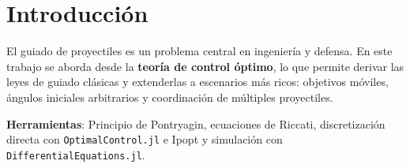 \section{Introducción}

El guiado de proyectiles es un problema central en ingeniería y defensa.
En este trabajo se aborda desde la \textbf{teoría de control óptimo},
lo que permite derivar las leyes de guiado clásicas y extenderlas a escenarios
más ricos: objetivos móviles, ángulos iniciales arbitrarios y coordinación
de múltiples proyectiles.

\textbf{Herramientas}: Principio de Pontryagin, ecuaciones de Riccati,
discretización directa con \texttt{OptimalControl.jl} e Ipopt y simulación con \texttt{DifferentialEquations.jl}.


\clearpage


\clearpage
\nocite{*}

